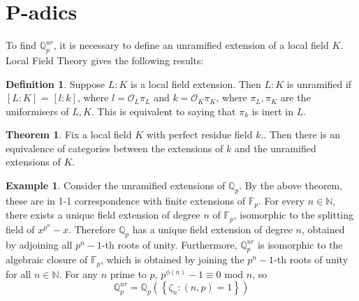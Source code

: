 \documentclass[12pt]{extarticle}
\newcommand{\N}{\mathbb{N}}
\newcommand{\F}{\mathbb{F}}
\newcommand{\Q}{\mathbb{Q}}
\newcommand{\co}{\mathcal{O}}
\newcommand{\<}{\langle}
\renewcommand{\>}{\rangle}
\theoremstyle{definition}
\newtheorem{theorem}{Theorem}
\newtheorem*{definition}{Definition}
\newtheorem*{example}{Example}
\begin{document}
\section{P-adics}
To find $\Q_p^{ur}$, it is necessary to define an unramified extension of a local field $K$. Local Field Theory gives the following results:
\begin{definition}
Suppose $L:K$ is a local field extension. Then $L:K$ is unramified if $[L:K]$ = $[l:k]$, where $l = \co_L\pi_L$ and $ k= \co_K\pi_K$, where $\pi_L,\pi_K$ are the uniformisers of $L,K$. This is equivalent to saying that $\pi_k$ is inert in $L$. 
\end{definition}
\begin{theorem}
Fix a local field $K$ with perfect residue field $k$.. Then there is an equivalence of categories
between the extensions of $k$ and the unramified extensions of $K$. 
\end{theorem}
\begin{example}
Consider the unramified extensions of $\Q_p$. By the above theorem, these are in 1-1 correspondence with finite extensions of $\F_p$. For every $n \in \N$, there exists a unique field extension of degree $n$ of $\F_p$, isomorphic to the splitting field of $x^{p^n}-x$. Therefore $\Q_p$ has a unique field extension of degree $n$, obtained by adjoining all $p^n-1$-th roots of unity. Furthermore,
$\Q_p^{ur}$ is isomorphic to the algebraic closure of $\F_p$, which is obtained by joining the $p^n-1$-th roots of unity for all $n \in \N$. For any $n$ prime to $p$, $p^{\phi(n)}-1 \equiv 0$ mod $n$, so 
\begin{equation}
\Q_p^{ur} = \Q_p(\left\{ \zeta_n: (n,p)=1 \right\})
\end{equation}
\end{example}
\end{document}
